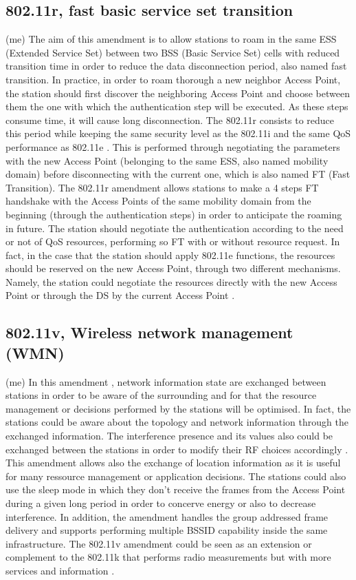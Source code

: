 \documentclass[journal,transmag]{IEEEtran}
\begin{document}
\subsection{802.11r, fast basic service set transition} (me)
The aim of this amendment is to allow stations to roam in the same ESS (Extended Service Set) between two BSS (Basic Service Set) cells with reduced transition time in order to reduce the data disconnection period, also named fast transition. In practice, in order to roam thorough a new neighbor Access Point, the station should first discover the neighboring Access Point and choose between them the one with which the authentication step will be executed. As these steps consume time, it will cause long disconnection. The 802.11r consists to reduce this period while keeping the same security level as the 802.11i and the same QoS performance as 802.11e \cite{16IEEE802.11k_r_v}. This is performed through negotiating the parameters with the new Access Point (belonging to the same ESS, also named mobility domain) before disconnecting with the current one, which is also named FT (Fast Transition). The 802.11r amendment allows stations to make a 4 steps FT handshake with the Access Points of the same mobility domain from the beginning (through the authentication steps) in order to anticipate the roaming in future. The station should negotiate the authentication according to the need or not of QoS resources, performing so FT with or without resource request. In fact, in the case that the station should apply 802.11e functions, the resources should be reserved on the new Access Point, through two different mechanisms. Namely, the station could negotiate the resources directly with the new Access Point or through the DS by the current Access Point \cite{16IEEE802.11k_r_v}.   

\subsection{802.11v, Wireless network management (WMN)} (me)
In this amendment \cite{16IEEE802.11k_r_v}, network information state are exchanged between stations in order to be aware of the surrounding and for that the resource management or decisions performed by the stations will be optimised. In fact, the stations could be aware about the topology and network information through the exchanged information. The interference presence and its values also could be exchanged between the stations in order to modify their RF choices accordingly \cite{16standard_802.11}. This amendment allows also the exchange of location information as it is useful for many ressource management or application decisions. The stations could also use the sleep mode in which they don't receive the frames from the Access Point during a given long period in order to concerve energy or also to decrease interference. In addition, the amendment handles the group addressed frame delivery and supports performing multiple BSSID capability inside the same infrastructure. The 802.11v amendment could be seen as an extension or complement to the 802.11k that performs radio measurements but with more services and information \cite{16IEEE802.11k_r_v}. 
\end{document}
